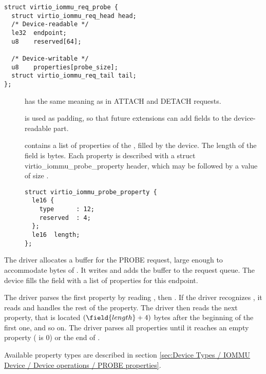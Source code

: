 \begin{lstlisting}
struct virtio_iommu_req_probe {
  struct virtio_iommu_req_head head;
  /* Device-readable */
  le32  endpoint;
  u8    reserved[64];

  /* Device-writable */
  u8    properties[probe_size];
  struct virtio_iommu_req_tail tail;
};
\end{lstlisting}

\begin{description}
\item[] has the same meaning as in ATTACH and DETACH
  requests.

\item[] is used as padding, so that future extensions can
  add fields to the device-readable part.

\item[] contains a list of properties of the
  , filled by the device. The length of the
   field is  bytes. Each property is
  described with a struct virtio_iommu_probe_property header, which may be
  followed by a value of size .

\begin{lstlisting}
struct virtio_iommu_probe_property {
  le16 {
    type      : 12;
    reserved  : 4;
  };
  le16  length;
};
\end{lstlisting}

\end{description}

The driver allocates a buffer for the PROBE request, large enough to
accommodate  bytes of . It writes
 and adds the buffer to the request queue. The device
fills the  field with a list of properties for this
endpoint.

The driver parses the first property by reading , then
. If the driver recognizes , it reads and
handles the rest of the property. The driver then reads the next property,
that is located $(\field{length} + 4)$ bytes after the beginning of the
first one, and so on. The driver parses all properties until it reaches an
empty property ( is 0) or the end of .

Available property types are described in section
\ref{sec:Device Types / IOMMU Device / Device operations / PROBE properties}.


